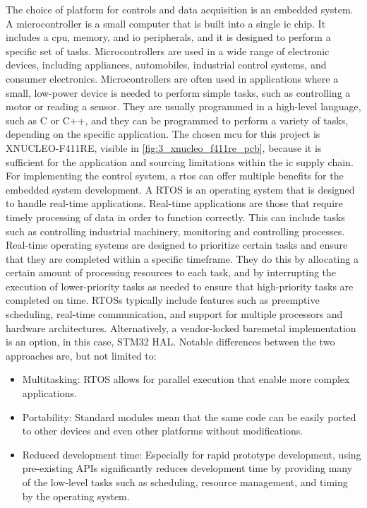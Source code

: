 The choice of platform for controls and data acquisition is an embedded system. A microcontroller is a small computer that is built into a single \gls{ic} chip. It includes a \gls{cpu}, memory, and \gls{io} peripherals, and it is designed to perform a specific set of tasks. Microcontrollers are used in a wide range of electronic devices, including appliances, automobiles, industrial control systems, and consumer electronics. Microcontrollers are often used in applications where a small, low-power device is needed to perform simple tasks, such as controlling a motor or reading a sensor. They are usually programmed in a high-level language, such as C or C++, and they can be programmed to perform a variety of tasks, depending on the specific application. The chosen \gls{mcu} for this project is XNUCLEO-F411RE, visible in \cref{fig:3_xnucleo_f411re_pcb}, because it is sufficient for the application and sourcing limitations within the \gls{ic} supply chain. For implementing the control system, a \gls{rtos} can offer multiple benefits for the embedded system development. A RTOS is an operating system that is designed to handle real-time applications. Real-time applications are those that require timely processing of data in order to function correctly. This can include tasks such as controlling industrial machinery, monitoring and controlling processes. Real-time operating systems are designed to prioritize certain tasks and ensure that they are completed within a specific timeframe. They do this by allocating a certain amount of processing resources to each task, and by interrupting the execution of lower-priority tasks as needed to ensure that high-priority tasks are completed on time. RTOSs typically include features such as preemptive scheduling, real-time communication, and support for multiple processors and hardware architectures. Alternatively, a vendor-locked baremetal implementation is an option, in this case, STM32 HAL. Notable differences between the two approaches are, but not limited to:
\begin{itemize}
	\item Multitasking: RTOS allows for parallel execution that enable more complex applications.
	\item Portability: Standard modules mean that the same code can be easily ported to other devices and even other platforms without modifications.
	\item Reduced development time: Especially for rapid prototype development, using pre-existing APIs significantly reduces development time by providing many of the low-level tasks such as scheduling, resource management, and timing by the operating system.
\end{itemize}

